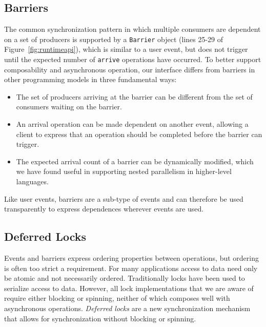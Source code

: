 \subsection{Barriers}
\label{subsec:barriers}
The common synchronization pattern in which multiple consumers are dependent on
a set of producers is supported by a {\tt Barrier} object (lines 25-29 of Figure~\ref{fig:runtimeapi}), which is similar
to a user event, but does not trigger until the expected number of {\tt arrive}
operations have occurred.  To better support
composability and asynchronous operation, our interface differs from barriers in other programming
models\cite{MPI} in three fundamental ways:
\begin{itemize} \itemsep1pt \parskip0pt 
\item The set of producers arriving at the barrier can be different from the set of consumers waiting on the barrier.
\item An arrival operation can be made dependent on another event, allowing a client to
express that an operation should be completed before the barrier can trigger.
\item The expected arrival count of a barrier can be dynamically modified, which we
have found useful in supporting nested parallelism in higher-level languages.
\end{itemize}

Like user events, barriers are a sub-type of events and can therefore
be used transparently to express dependences wherever events are used.

\subsection{Deferred Locks}
\label{subsec:locks}

Events and barriers express ordering properties between operations, but 
ordering is often too strict a requirement.  For many applications access to data need only be atomic and
not necessarily ordered.  Traditionally locks have been used to serialize access to
data.  However, all lock implementations that we are aware of require either blocking
or spinning, neither of which composes well with asynchronous operations.
{\em Deferred locks} are a new synchronization mechanism that allows for synchronization
without blocking or spinning.

